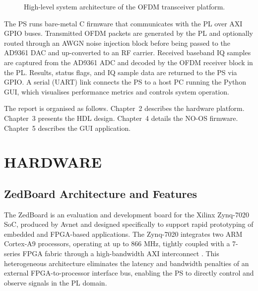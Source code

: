 \documentclass[12pt, a4paper, oneside]{report}
\begin{document}
\begin{figure}[H]
{%
  }
  \caption{High-level system architecture of the OFDM transceiver platform.}
  \label{fig:system_overview}
\end{figure}

The PS runs bare-metal C firmware that communicates with the PL over AXI GPIO buses. Transmitted OFDM packets are generated by the PL and optionally routed through an AWGN noise injection block before being passed to the AD9361 DAC and up-converted to an RF carrier. Received baseband IQ samples are captured from the AD9361 ADC and decoded by the OFDM receiver block in the PL. Results, status flags, and IQ sample data are returned to the PS via GPIO. A serial (UART) link connects the PS to a host PC running the Python GUI, which visualises performance metrics and controls system operation.

The report is organised as follows. Chapter~2 describes the hardware platform. Chapter~3 presents the HDL design. Chapter~4 details the NO-OS firmware. Chapter~5 describes the GUI application.

\chapter{HARDWARE}

\section{ZedBoard Architecture and Features}

The ZedBoard is an evaluation and development board for the Xilinx Zynq-7020 SoC, produced by Avnet and designed specifically to support rapid prototyping of embedded and FPGA-based applications. The Zynq-7020 integrates two ARM Cortex-A9 processors, operating at up to 866 MHz, tightly coupled with a 7-series FPGA fabric through a high-bandwidth AXI interconnect \cite{xilinx_zynq_trm}. This heterogeneous architecture eliminates the latency and bandwidth penalties of an external FPGA-to-processor interface bus, enabling the PS to directly control and observe signals in the PL domain.
\end{document}
